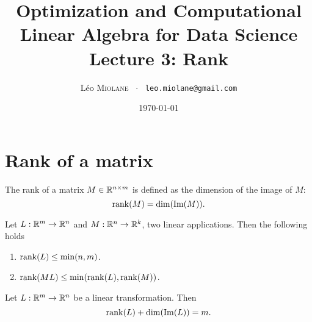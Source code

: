 \documentclass[11pt,nocut]{article}
\title{\vspace{-2.0cm}%
	Optimization and Computational Linear Algebra for Data Science\\
	Lecture 3: Rank}
\author{Léo \textsc{Miolane} \ $\cdot$ \ \texttt{leo.miolane@gmail.com}}
\date{\today}
\begin{document}
\maketitle

\section{Rank of a matrix}

\begin{definition}[Rank]
	The rank of a matrix $M \in \mathbb{R}^{n \times m}$ is defined as the dimension of the image of $M$:
	$$
	{{\rm rank}}(M) = {{\rm dim}}({{\rm Im}}(M)).
	$$
\end{definition}

\begin{proposition}
	Let $L: \mathbb{R}^m \to \mathbb{R}^n$ and $M: \mathbb{R}^n \to \mathbb{R}^k$, two linear applications. Then the following holds
	\begin{enumerate}[label=(\roman*)]
		\item ${{\rm rank}}(L) \leq \min(n,m)$.
		\item ${{\rm rank}}(ML) \leq \min({{\rm rank}}(L),{{\rm rank}}(M))$.
	\end{enumerate}
\end{proposition}

\begin{theorem}
	Let $L: \mathbb{R}^m \to \mathbb{R}^n$ be a linear transformation. Then
	$$
	{{\rm rank}}(L) + {{\rm dim}}({{\rm Im}}(L)) = m.
	$$
\end{theorem}



	\vspace{1cm}
	\centerline{}

%
%
\end{document}
